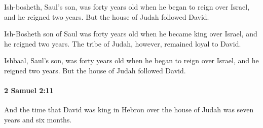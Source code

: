 			\begin{versebox}
					\item[BHS] 
					\item[ASV] Ish-bosheth, Saul's son, was forty years old when he began to reign over Israel, and he reigned two years. But the house of Judah followed David.
					\item[NIV] Ish-Bosheth son of Saul was forty years old when he became king over Israel, and he reigned two years. The tribe of Judah, however, remained loyal to David.
					\item[NRSV] Ishbaal, Saul’s son, was forty years old when he began to reign over Israel, and he reigned two years. But the house of Judah followed David.
			\end{versebox}

		\paragraph{2 Samuel 2:11} %
			\label{2SAMUEL-2-11}

			And the time that David was king in Hebron over the house of Judah was seven years and six months.

